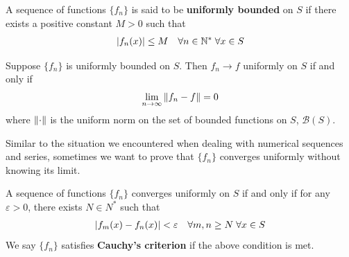 \documentclass[thmcnt=section, 12pt]{my-elegantbook}
\begin{document}

A sequence of functions $\{f_n\}$ is said to be \textbf{uniformly bounded} on $S$ if there exists a positive constant $M > 0$ such that
\begin{align*}
    \left\lvert f_n(x) \right\rvert \leq M
    \quad \forall n \in \mathbb{N}^\ast \;
    \forall x \in S
\end{align*}


\begin{theorem}
    Suppose $\{f_n\}$ is uniformly bounded on $S$. Then $f_n \to f$ uniformly on $S$ if and only if
    \begin{align*}
        \lim_{n \to \infty} \left\lVert f_n - f \right\rVert = 0
    \end{align*}
    where $\left\lVert \cdot \right\rVert$ is the uniform norm on the set of bounded functions on $S$, $\mathcal{B}(S)$.
\end{theorem}



Similar to the situation we encountered when dealing with numerical sequences and series, sometimes we want to prove that $\{f_n\}$ converges uniformly without knowing its limit.

\begin{theorem} \label{thm:42}
    A sequence of functions $\{f_n\}$ converges uniformly on $S$ if and only if for any $\varepsilon > 0$, there exists $N \in N^\ast$ such that
    \begin{align*}
        \left\lvert f_m(x) - f_n(x) \right\rvert < \varepsilon
        \quad \forall m, n \geq N \;
        \forall x \in S
    \end{align*}
    We say $\{f_n\}$ satisfies \textbf{Cauchy's criterion} if the above condition is met.
\end{theorem}
\end{document}
